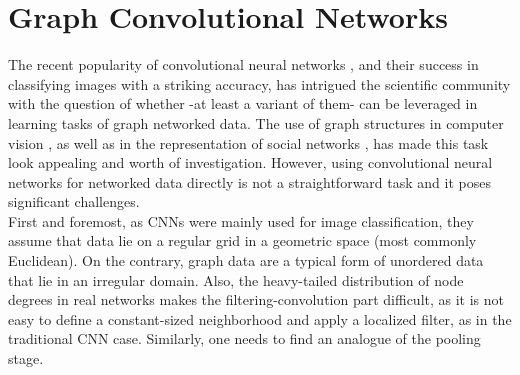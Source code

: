 \section{Graph Convolutional Networks}

The recent popularity of convolutional neural networks \cite{krizhevsky2012imagenet}, and their
success in classifying images with a striking accuracy, has intrigued the scientific
community with the question of whether -at least a variant of them- can be leveraged in learning tasks
of graph networked data. The use of graph structures in computer
vision \cite{shokoufandeh2000graph}, as well as in the representation of social networks
\cite{easley2010networks}, has made this task look appealing and worth of investigation.
However, using convolutional neural networks for
networked data directly is not a straightforward task and it poses significant
challenges.\\

 First and foremost,
as CNNs were mainly used for image classification, they assume that
data lie on a regular grid in a geometric space (most commonly
Euclidean). On the contrary, graph data are a typical form of unordered data that lie in
an irregular domain. Also, the heavy-tailed distribution of node degrees
in real networks \cite{faloutsos1999powerlaw} makes the filtering-convolution part difficult,
as it is not easy to define a constant-sized neighborhood and apply a
localized filter, as in the traditional CNN case. Similarly, one needs to find an analogue of the pooling stage.\\

